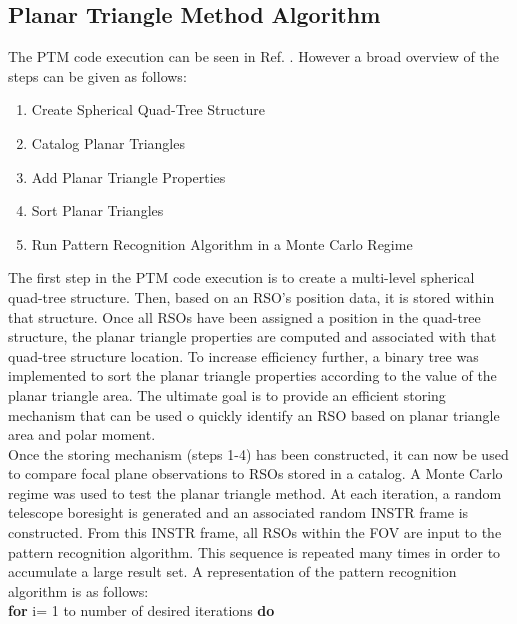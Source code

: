 \documentclass[]{aiaa-tc}%
\begin{document}
\subsection{Planar Triangle Method Algorithm}

The PTM code execution can be seen in Ref. . However  a broad overview of the steps can be given as follows:

\begin{enumerate}
\item Create Spherical Quad-Tree Structure
\item Catalog Planar Triangles
\item Add Planar Triangle Properties
\item Sort Planar Triangles
\item Run Pattern Recognition Algorithm in a Monte Carlo Regime
\end{enumerate}

The first step in the PTM code execution is to create a multi-level spherical quad-tree structure. Then, based on an RSO's position data, it is stored within that
structure. Once all RSOs have been assigned a position in the quad-tree structure, the planar
triangle properties are computed and associated with that quad-tree structure location. To increase
efficiency further, a binary tree was implemented to sort the planar triangle properties according to
the value of the planar triangle area. The ultimate goal is to provide an efficient storing mechanism that can be used o quickly identify an RSO based on planar triangle area and polar moment.\\

Once the storing mechanism (steps 1-4) has been constructed, it can now be used to compare focal plane observations to RSOs stored in a catalog. A Monte Carlo regime was used to test the planar triangle method. At each iteration, a random telescope boresight is generated and an associated random INSTR frame is constructed. From this INSTR frame, all RSOs within the FOV are input to the pattern recognition algorithm. This sequence is repeated many times in
order to accumulate a large result set. A representation of the pattern recognition algorithm is as follows:\\

\textbf{for} i= 1 to number of desired iterations \textbf{do}
\end{document}
